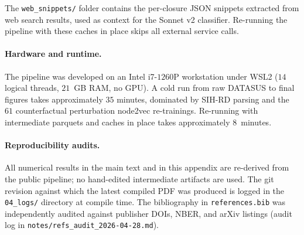 The \texttt{web\_snippets/} folder contains the per-closure JSON
snippets extracted from web search results, used as context for the
Sonnet v2 classifier. Re-running the pipeline with these caches in
place skips all external service calls.

\paragraph{Hardware and runtime.} The pipeline was developed on an
Intel i7-$1260$P workstation under WSL2 ($14$ logical threads, $21$~GB
RAM, no GPU). A cold run from raw DATASUS to final figures takes
approximately $35$ minutes, dominated by SIH-RD parsing and the $61$
counterfactual perturbation node2vec re-trainings. Re-running with
intermediate parquets and caches in place takes approximately
$8$~minutes.

\paragraph{Reproducibility audits.} All numerical results in the main
text and in this appendix are re-derived from the public pipeline; no
hand-edited intermediate artifacts are used. The git revision against
which the latest compiled PDF was produced is logged in the
\texttt{04\_logs/} directory at compile time. The bibliography in
\texttt{references.bib} was independently audited against publisher
DOIs, NBER, and arXiv listings (audit log in
\texttt{notes/refs\_audit\_2026-04-28.md}).
